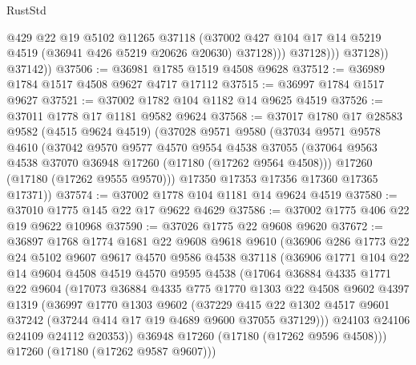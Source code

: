 \begin{lexlean}{RustStd}
\begin{coremodule}
{\begin{coremodule}
{{{{{{{{{{{{{{{{{{{{{{{{{{{{{{{{{{{{{{{{{{{{{{{{{{{{{{{                      @429
                      @22
                      @19
                      @5102
                      @11265
                      @37118
                      (@37002
                        @427
                        @104
                        @17
                        @14
                        @5219
                        @4519
                        (@36941 @426 @5219 @20626 @20630)
                        @37128)))
                  @37128)))
            @37128))
        @37142))
@37506 := @36981 @1785 @1519 @4508 @9628
@37512 := @36989 @1784 @1517 @4508 @9627 @4717 @17112
@37515 := @36997 @1784 @1517 @9627
@37521 := @37002 @1782 @104 @1182 @14 @9625 @4519
@37526 := @37011 @1778 @17 @1181 @9582 @9624
@37568 := @37017
    @1780
    @17
    @28583
    @9582
    (@4515 @9624 @4519)
    (@37028
      @9571
      @9580
      (@37034
        @9571
        @9578
        @4610
        (@37042
          @9570
          @9577
          @4570
          @9554
          @4538
          @37055
          (@37064 @9563 @4538 @37070 @36948 @17260 (@17180 (@17262 @9564 @4508)))
          @17260
          (@17180 (@17262 @9555 @9570)))
        @17350
        @17353
        @17356
        @17360
        @17365
        @17371))
@37574 := @37002 @1778 @104 @1181 @14 @9624 @4519
@37580 := @37010 @1775 @145 @22 @17 @9622 @4629
@37586 := @37002 @1775 @406 @22 @19 @9622 @10968
@37590 := @37026 @1775 @22 @9608 @9620
@37672 := @36897
    @1768
    @1774
    @1681
    @22
    @9608
    @9618
    @9610
    (@36906
      @286
      @1773
      @22
      @24
      @5102
      @9607
      @9617
      @4570
      @9586
      @4538
      @37118
      (@36906
        @1771
        @104
        @22
        @14
        @9604
        @4508
        @4519
        @4570
        @9595
        @4538
        (@17064
          @36884
          @4335
          @1771
          @22
          @9604
          (@17073
            @36884
            @4335
            @775
            @1770
            @1303
            @22
            @4508
            @9602
            @4397
            @1319
            (@36997
              @1770
              @1303
              @9602
              (@37229
                @415
                @22
                @1302
                @4517
                @9601
                @37242
                (@37244 @414 @17 @19 @4689 @9600 @37055 @37129)))
            @24103
            @24106
            @24109
            @24112
            @20353))
        @36948
        @17260
        (@17180 (@17262 @9596 @4508)))
      @17260
      (@17180 (@17262 @9587 @9607)))
}}}}}}}}}}}}}}}}}}}}}}}}}}}}}}}}}}}}}}}}}}}}}}}}}}}}}}}
\end{coremodule}}
\end{coremodule}
\end{lexlean}
